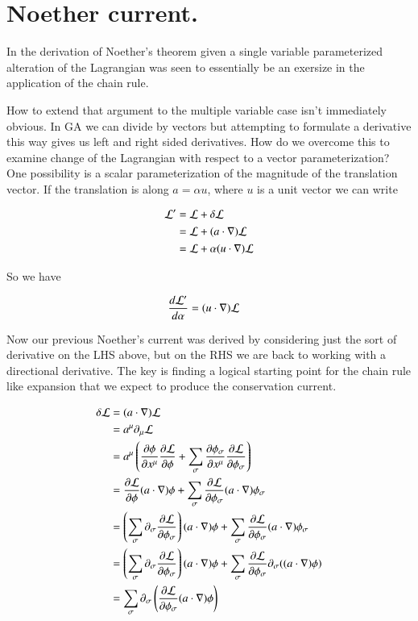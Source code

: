\documentclass{article}
\begin{document}
\section{ Noether current. }

In
\cite{PJFieldLagrangian}
the derivation of Noether's theorem given a single variable parameterized
alteration of the Lagrangian was seen to essentially be an exersize in the
application of the chain rule.

How to extend that argument to the multiple variable case isn't immediately
obvious.  In GA we can divide by vectors but attempting to formulate
a derivative this way gives us left and right sided derivatives.  How do we
overcome this to examine change of the Lagrangian with respect to a 
vector parameterization?
One possibility is a scalar parameterization of the magnitude 
of the translation vector.  If the translation is along $a = \alpha u$,
where $u$ is a unit vector we can write

\begin{align*}
\LL' &= \LL + \delta \LL  \\
&= \LL + (a \cdot \grad) \LL \\
&= \LL + \alpha (u \cdot \grad) \LL \\
\end{align*}

So we have

\begin{align*}
\frac{d\LL'}{d\alpha} 
&=
(u \cdot \grad) \LL
\end{align*}

Now our previous Noether's current was derived by considering just
the sort of derivative on the LHS above, but on the RHS we are back 
to working with a directional derivative.  The key is finding a 
logical starting point for the chain rule like expansion that we expect 
to produce the conservation current.

\begin{align*}
\delta \LL 
&=  (a \cdot \grad ) \LL \\
&=  a^\mu \partial_\mu \LL \\
&=  a^\mu \left(
\PD{x^\mu}{\phi} \PD{\phi}{\LL}
+\sum_\sigma
\PD{x^\mu}{\phi_\sigma} \PD{\phi_\sigma}{\LL}
\right) \\
&=  
\PD{\phi}{\LL} (a \cdot \grad) \phi 
+
\sum_\sigma
\PD{\phi_\sigma}{\LL}
(a \cdot \grad) \phi_\sigma
\\
&=  
\left(
\sum_\sigma
\partial_\sigma
\PD{\phi_\sigma}{\LL}
\right)
(a \cdot \grad) \phi 
+
\sum_\sigma
\PD{\phi_\sigma}{\LL}
(a \cdot \grad) \phi_\sigma
\\
&=  
\left(
\sum_\sigma
\partial_\sigma
\PD{\phi_\sigma}{\LL}
\right)
(a \cdot \grad) \phi 
+
\sum_\sigma
\PD{\phi_\sigma}{\LL}
\partial_\sigma
((a \cdot \grad) \phi)
\\
&=  
\sum_\sigma
\partial_\sigma
\left(
\PD{\phi_\sigma}{\LL}
(a \cdot \grad) \phi 
\right)
\\
\end{align*}
\end{document}
